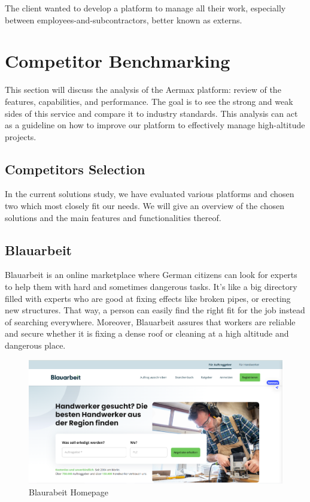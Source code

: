 The client wanted to develop a platform to manage all their work, especially between employees-and-subcontractors, better known as externs.

\section{Competitor Benchmarking}
This section will discuss the analysis of the Aermax platform: review of the features, capabilities, and performance. The goal is to see the strong and weak sides of this service and compare it to industry standards. This analysis can act as a guideline on how to improve our platform to effectively manage high-altitude projects.
\subsection{Competitors Selection}
In the current solutions study, we have evaluated various platforms and chosen two which most closely fit our needs. We will give an overview of the chosen solutions and the main features and functionalities thereof.

\subsection{Blauarbeit}
Blauarbeit is an online marketplace where German citizens can look for experts to help them with hard and sometimes dangerous tasks.
It's like a big directory filled with experts who are good at fixing effects like broken pipes, or erecting new structures.
That way, a person can easily find the right fit for the job instead of searching everywhere. Moreover, Blauarbeit assures that workers are reliable and secure whether it is fixing a dense roof or cleaning at a high altitude and dangerous place.


\begin{figure}[H]
    \centering
    \includegraphics[width=\linewidth]{src/assets/chapters/Blaurabeit.PNG}
    \caption{Blaurabeit Homepage}
    \label{fig:blaurabeit_image}
\end{figure}


